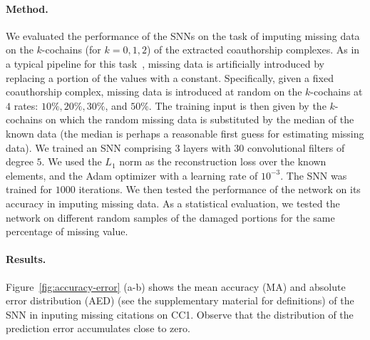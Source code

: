 \paragraph{Method.}
We evaluated the performance of the SNNs on the task of imputing missing data on the $k$-cochains (for $k=0,1,2$) of the extracted coauthorship complexes. As in a typical pipeline for this task~\cite{nelwamondo2007missing}, missing data is artificially introduced by replacing a portion of the values with a constant. Specifically, given a fixed coauthorship complex, missing data is introduced at random on the $k$-cochains at $4$ rates: $10\%,  20\%,  30\%$, and $50\%$. The training input is then given by the $k$-cochains on which the random missing data is substituted by the median of the known data (the median is perhaps a reasonable first guess for estimating missing data). We trained an SNN comprising $3$ layers with $30$ convolutional filters of degree $5$. We used the $L_1$ norm as the reconstruction loss over the known elements, and the Adam optimizer with a learning rate of $10^{-3}$. The SNN was trained for $1000$ iterations. We then tested the performance of the network on its accuracy in imputing missing data. As a statistical evaluation, we tested the network on different random samples of the damaged portions for the same percentage of missing value.
\paragraph{Results.}
Figure~\ref{fig:accuracy-error} (a-b) shows the mean accuracy (MA) and absolute error distribution (AED) (see the supplementary material for definitions) of the SNN in inputing missing citations on CC1. Observe that the distribution of the prediction error accumulates close to zero.


